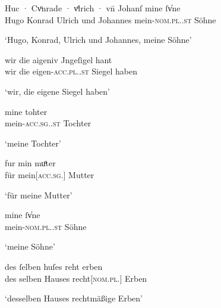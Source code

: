 \begin{exe}
\ex \label{ex:adjkonstregel}
	\begin{xlist}
	\ex \label{ex:adjkonstregel_1}
		\gll Huc · Cvͦnrade · vͦlrich · vn̄ Johanſ mine ſv̓ne \\
			Hugo {} Konrad {} Ulrich {} und Johannes
				mein-\textsc{nom.pl.\MascM.st} Söhne \\
		\begin{taggedline}{\parencites(Konstanz, 1297)[\pno~2654, 57.33]{cao4}}
		\trans `Hugo, Konrad, Ulrich und Johannes, meine Söhne'
		\end{taggedline}

	\ex \label{ex:adjkonstregel_2}
		\gll wir die aigeniv Jngeſigel hant \\
			wir die eigen-\textsc{acc.pl.\NeutI.st} Siegel haben \\
		\begin{taggedline}{\parencites(Konstanz, 1282)[\pno~530~AB, 468.3--4]{cao1}}
		\trans `wir, die eigene Siegel haben'
		\end{taggedline}
	\end{xlist}

\ex \label{ex:adjkonstesg}
	\begin{xlist}
	\ex \label{ex:adjkonstesg_1}
		\gll mine tohter \\
			mein-\textsc{acc.sg.\FemF.st} Tochter \\
		\begin{taggedline}{\parencites(Überlingen, Bodenseekr., 1295)[\pno~2226, 373.42]{cao3}}
		\trans `meine Tochter'
		\end{taggedline}

	\ex \label{ex:adjkonstesg_2}
		\gll fur min muͦter \\
			für mein[\textsc{acc.sg.\FemF}] Mutter \\
		\begin{taggedline}{\parencites(Konstanz, 1282)[\pno~530~B, 464.12]{cao1}}
		\trans `für meine Mutter'
		\end{taggedline}
	\end{xlist}
\end{exe}

\begin{exe}
\ex \label{ex:adjkonstepl}
	\begin{xlist}
	\ex \label{ex:adjkonstepl_1}
		\gll mine ſv̓ne \\
			mein-\textsc{nom.pl.\MascM.st} Söhne \\
		\begin{taggedline}{\parencites(Konstanz, 1297)[\pno~2654, 57.44]{cao4}}
		\trans `meine Söhne'
		\end{taggedline}

	\ex \label{ex:adjkonstepl_2}
		\gll des ſelben huſes reht erben \\
			des selben Hauses recht[\textsc{nom.pl.\MascA}] Erben \\
		\begin{taggedline}{\parencites(Konstanz, 1297)[\pno~2675, 71.34]{cao4}}
		\trans `desselben Hauses rechtmäßige Erben'
		\end{taggedline}
	\end{xlist}
\end{exe}

